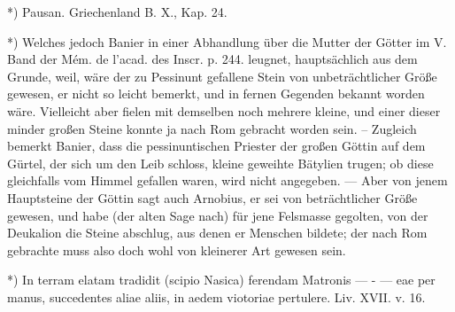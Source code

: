 \documentclass[a4paper, 11pt, oneside, polutonikogreek, german]{article}
\begin{document}
*) Pausan. Griechenland B. X., Kap. 24.

*) Welches jedoch Banier in einer Abhandlung über die Mutter der Götter im V. Band der Mém. de l'acad. des Inscr. p. 244. leugnet, hauptsächlich aus dem Grunde, weil, wäre der zu Pessinunt gefallene Stein von unbeträchtlicher Größe gewesen, er nicht so leicht bemerkt, und in fernen Gegenden bekannt worden wäre. Vielleicht aber fielen mit demselben noch mehrere kleine, und einer dieser minder großen Steine konnte ja nach Rom gebracht worden sein. -- Zugleich bemerkt Banier, dass die pessinuntischen Priester der großen Göttin auf dem Gürtel, der sich um den Leib schloss, kleine geweihte Bätylien trugen; ob diese gleichfalls vom Himmel gefallen waren, wird nicht angegeben. --- Aber von jenem Hauptsteine der Göttin sagt auch Arnobius, er sei von beträchtlicher Größe gewesen, und habe (der alten Sage nach) für jene Felsmasse gegolten, von der Deukalion die Steine abschlug, aus denen er Menschen bildete; der nach Rom gebrachte muss also doch wohl von kleinerer Art gewesen sein.

*) In terram elatam tradidit (scipio Nasica) ferendam Matronis --- - --- eae per manus, succedentes aliae aliis, in aedem viotoriae pertulere. Liv. XVII. v. 16.
\end{document}

